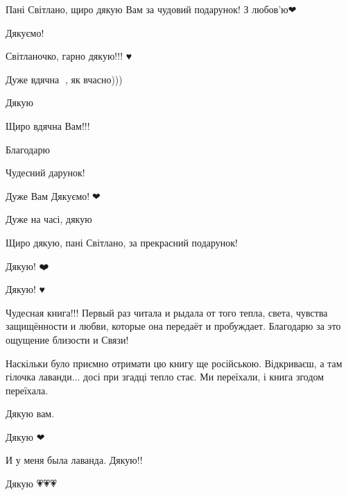 
Пані Світлано, щиро дякую Вам за чудовий подарунок! З любов'ю❤


Дякуємо! 💙💛


Світланочко, гарно дякую!!! ♥️💙💛


Дуже вдячна 💓, як вчасно)))


Дякую 🙏💖


Щиро вдячна Вам!!!


Благодарю


Чудесний дарунок!


Дуже Вам Дякуємо!🙏❤


Дуже на часі, дякую


Щиро дякую, пані Світлано, за прекрасний подарунок!


Дякую! ❤️


Дякую! ♥️🙏


Чудесная книга!!! Первый раз читала и рыдала от того тепла, света, чувства
защищённости и любви, которые она передаёт и пробуждает. Благодарю за это
ощущение близости и Связи!


Наскільки було приємно отримати цю книгу ще російською. Відкриваєш, а там
гілочка лаванди... досі при згадці тепло стає. Ми переїхали, і книга згодом
переїхала.

Дякую вам.


Дякую ❤


И у меня была лаванда. Дякую!!


Дякую 💗💗💗

